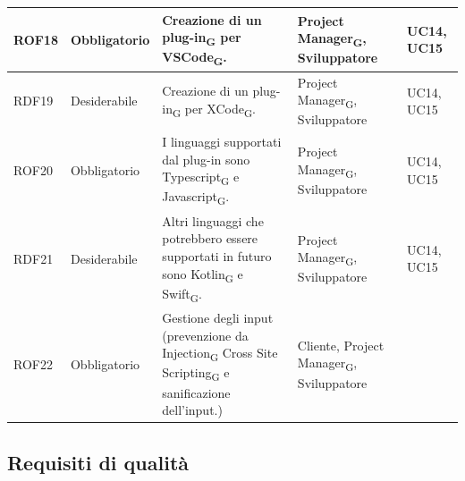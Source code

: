 \documentclass{article}
\begin{document}
\begin{center}
\begin{tabular}{|p{2cm}|p{3cm}|p{6cm}|p{3cm}|p{2cm}|}
\rowcolor{LightBlue}
ROF18&Obbligatorio & Creazione di un plug-in\textsubscript{G} per VSCode\textsubscript{G}.& Project Manager\textsubscript{G}, Sviluppatore& UC14, UC15\\
\hline
\rowcolor{LighterBlue}
RDF19&Desiderabile & Creazione di un plug-in\textsubscript{G} per XCode\textsubscript{G}.& Project Manager\textsubscript{G}, Sviluppatore& UC14, UC15\\
\hline
\rowcolor{LightBlue}
ROF20&Obbligatorio & I linguaggi supportati dal plug-in sono Typescript\textsubscript{G} e Javascript\textsubscript{G}. & Project Manager\textsubscript{G}, Sviluppatore &UC14, UC15\\
\hline
\rowcolor{LighterBlue}
RDF21&Desiderabile & Altri linguaggi che potrebbero essere supportati in futuro sono Kotlin\textsubscript{G} e Swift\textsubscript{G}.& Project Manager\textsubscript{G}, Sviluppatore &UC14, UC15\\
\hline
\rowcolor{LightBlue}
ROF22 & Obbligatorio & Gestione degli input (prevenzione da Injection\textsubscript{G} Cross Site Scripting\textsubscript{G} e sanificazione dell'input.) & Cliente, Project Manager\textsubscript{G}, Sviluppatore & \\
\hline

\end{tabular}
\label{tab:reqfunz}
\end{center}

\subsection{Requisiti di qualità}
\end{document}
